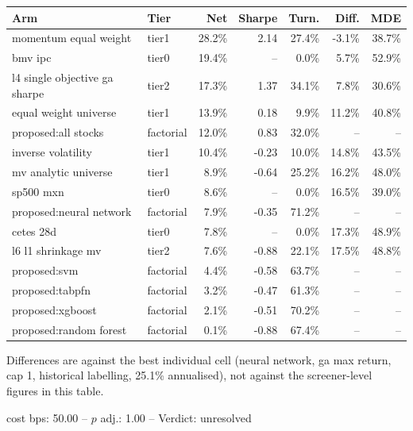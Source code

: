 \begin{threeparttable}
\footnotesize
\setlength{\tabcolsep}{4pt}
\begin{tabularx}{\linewidth}{>{\raggedright\arraybackslash}Xlrrrrr}
\toprule
Arm & Tier & Net & Sharpe & Turn. & Diff. & MDE \\
\midrule
momentum equal weight & tier1 & 28.2\% & 2.14 & 27.4\% & -3.1\% & 38.7\% \\
bmv ipc & tier0 & 19.4\% & -- & 0.0\% & 5.7\% & 52.9\% \\
l4 single objective ga sharpe & tier2 & 17.3\% & 1.37 & 34.1\% & 7.8\% & 30.6\% \\
equal weight universe & tier1 & 13.9\% & 0.18 & 9.9\% & 11.2\% & 40.8\% \\
proposed:all stocks & factorial & 12.0\% & 0.83 & 32.0\% & -- & -- \\
inverse volatility & tier1 & 10.4\% & -0.23 & 10.0\% & 14.8\% & 43.5\% \\
mv analytic universe & tier1 & 8.9\% & -0.64 & 25.2\% & 16.2\% & 48.0\% \\
sp500 mxn & tier0 & 8.6\% & -- & 0.0\% & 16.5\% & 39.0\% \\
proposed:neural network & factorial & 7.9\% & -0.35 & 71.2\% & -- & -- \\
cetes 28d & tier0 & 7.8\% & -- & 0.0\% & 17.3\% & 48.9\% \\
l6 l1 shrinkage mv & tier2 & 7.6\% & -0.88 & 22.1\% & 17.5\% & 48.8\% \\
proposed:svm & factorial & 4.4\% & -0.58 & 63.7\% & -- & -- \\
proposed:tabpfn & factorial & 3.2\% & -0.47 & 61.3\% & -- & -- \\
proposed:xgboost & factorial & 2.1\% & -0.51 & 70.2\% & -- & -- \\
proposed:random forest & factorial & 0.1\% & -0.88 & 67.4\% & -- & -- \\
\bottomrule
\end{tabularx}
\begin{tablenotes}[flushleft]\footnotesize
  \item Differences are against the best individual cell (neural network, ga max return, cap 1, historical labelling, 25.1\% annualised), not against the screener-level figures in this table.
  \item cost bps: 50.00 -- $p$ adj.: 1.00 -- Verdict: unresolved
\end{tablenotes}
\end{threeparttable}
